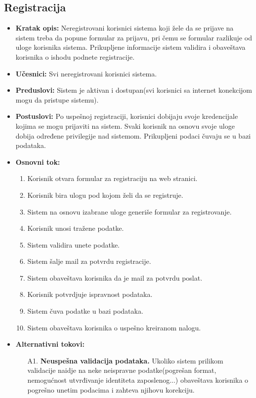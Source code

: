 \documentclass{article}
\begin{document}
\subsection{Registracija}
\begin{itemize}
    \item \textbf{Kratak opis:} Neregistrovani korisnici sistema koji žele da se prijave na sistem treba da popune formular za prijavu, pri čemu se formular razlikuje od uloge korisnika sistema. Prikupljene informacije sistem validira i obaveštava korisnika o ishodu podnete registracije.
    \item \textbf{Učesnici:} Svi neregistrovani korisnici sistema.
    \item \textbf{Preduslovi:} Sistem je aktivan i dostupan(svi korisnici sa internet konekcijom mogu da pristupe sistemu).
    \item \textbf{Postuslovi:} Po uspešnoj registraciji, korisnici dobijaju svoje kredencijale kojima se mogu prijaviti na sistem. Svaki korisnik na osnovu svoje uloge dobija određene privilegije nad sistemom. Prikupljeni podaci čuvaju se u bazi podataka.
    \item \textbf{Osnovni tok:}
        \begin{enumerate}
            \item Korisnik otvara formular za registraciju na web stranici.
            \item Korisnik bira ulogu pod kojom želi da se registruje.
            \item Sistem na osnovu izabrane uloge generiše formular za registrovanje.
            \item Korisnik unosi tražene podatke.
            \item Sistem validira unete podatke.
            \item Sistem šalje mail za potvrdu registracije.
            \item Sistem obaveštava korisnika da je mail za potvrdu poslat.
            \item Korisnik potvrdjuje ispravnost podataka.
            \item Sistem čuva podatke u bazi podataka.
            \item Sistem obaveštava korisnika o uspešno kreiranom nalogu.
	    \end{enumerate}
    \item \textbf{Alternativni tokovi:}
        \begin{itemize}
            \item[A1.] \textbf{Neuspešna validacija podataka.} Ukoliko sistem prilikom validacije naidje na neke neispravne podatke(pogrešan format, nemogućnost utvrđivanje identiteta zaposlenog...) obaveštava korisnika o pogrešno unetim podacima i zahteva njihovu korekciju.

\end{itemize}
\end{itemize}
\end{document}
